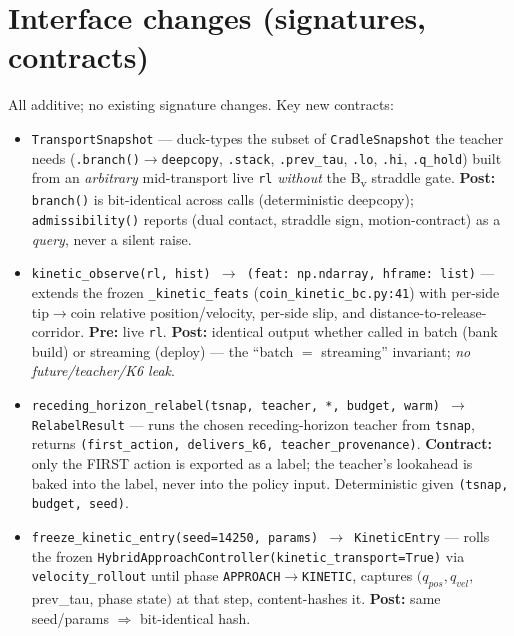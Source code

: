 \documentclass[11pt]{article}
\newcommand{\code}[1]{\texttt{\small #1}}
\begin{document}
\section{Interface changes (signatures, contracts)}
All additive; no existing signature changes. Key new contracts:
\begin{itemize}[nosep,leftmargin=1.4em]
  \item \code{TransportSnapshot} --- duck-types the subset of \code{CradleSnapshot} the teacher needs
  (\code{.branch()$\to$deepcopy}, \code{.stack}, \code{.prev\_tau}, \code{.lo}, \code{.hi}, \code{.q\_hold}) built from an
  \emph{arbitrary} mid-transport live \code{rl} \emph{without} the B\textsubscript{v} straddle gate.
  \textbf{Post:} \code{branch()} is bit-identical across calls (deterministic deepcopy); \code{admissibility()} reports
  (dual contact, straddle sign, motion-contract) as a \emph{query}, never a silent raise.
  \item \code{kinetic\_observe(rl, hist) $\to$ (feat: np.ndarray, hframe: list)} --- extends the frozen
  \code{\_kinetic\_feats} (\code{coin\_kinetic\_bc.py:41}) with per-side tip$\to$coin relative position/velocity, per-side
  slip, and distance-to-release-corridor. \textbf{Pre:} live \code{rl}. \textbf{Post:} identical output whether called
  in batch (bank build) or streaming (deploy) --- the ``batch $=$ streaming'' invariant; \emph{no future/teacher/K6 leak}.
  \item \code{receding\_horizon\_relabel(tsnap, teacher, *, budget, warm) $\to$ RelabelResult} --- runs the chosen
  receding-horizon teacher from \code{tsnap}, returns \code{(first\_action, delivers\_k6, teacher\_provenance)}.
  \textbf{Contract:} only the FIRST action is exported as a label; the teacher's lookahead is baked into the label, never
  into the policy input. Deterministic given \code{(tsnap, budget, seed)}.
  \item \code{freeze\_kinetic\_entry(seed=14250, params) $\to$ KineticEntry} --- rolls the frozen
  \code{HybridApproachController(kinetic\_transport=True)} via \code{velocity\_rollout} until phase
  \code{APPROACH$\to$KINETIC}, captures $(q_{pos},q_{vel},$prev\_tau, phase state$)$ at that step, content-hashes it.
  \textbf{Post:} same seed/params $\Rightarrow$ bit-identical hash.
\end{itemize}
\end{document}
